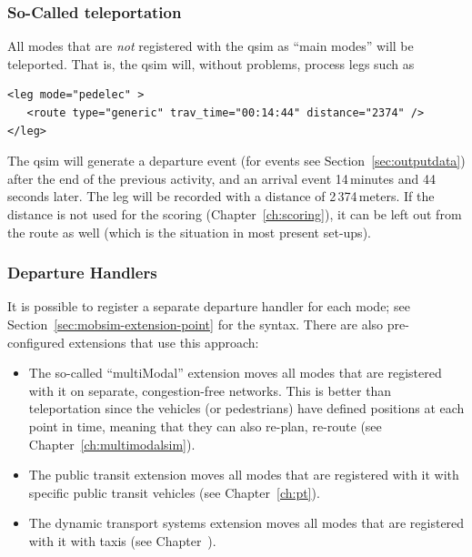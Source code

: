 \subsubsection{So-Called \Gls{teleportation}}
All modes that are \emph{not} registered with the \gls{qsim} as ``main modes'' will be teleported.  That is, the \gls{qsim} will, without problems, process legs such as
\begin{lstlisting}
<leg mode="pedelec" >
   <route type="generic" trav_time="00:14:44" distance="2374" />
</leg>
\end{lstlisting}
The \gls{qsim} will generate a departure event (for events see Section~\ref{sec:outputdata}) after the end of the previous activity, and an arrival event 14\,minutes and 44\,seconds later.  The leg will be recorded with a distance of 2\,374\,meters.  If the distance is not used for the scoring (\cf Chapter~\ref{ch:scoring}), it can be left out from the route as well (which is the situation in most present set-ups).

\subsubsection{Departure Handlers}
\label{sec:departure-handlers}
It is possible to register a separate departure handler for each mode; see Section~\ref{sec:mobsim-extension-point} for the syntax.  There are also pre-configured extensions that use this approach:
%
\begin{itemize}\styleItemize

\item The so-called ``multiModal'' extension moves all modes that are registered with it on separate, congestion-free networks.  This is better than \gls{teleportation} since the vehicles (or pedestrians) have defined positions at each point in time, meaning that they can also re-plan, \eg re-route (see Chapter~\ref{ch:multimodalsim}).

\item The public transit extension moves all modes that are registered with it with specific public transit vehicles (see Chapter~\ref{ch:pt}).

\item The dynamic transport systems extension moves all modes that are registered with it with taxis (see Chapter~\pageref{ch:dts}).

\end{itemize}

